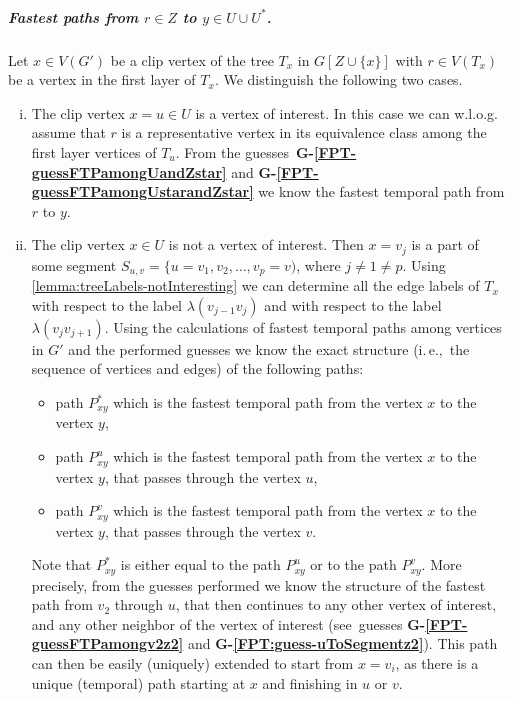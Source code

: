 \documentclass[a4paper,UKenglish,cleveref, autoref, thm-restate]{lipics-v2021}
\newcommand{\ie}{i.\,e.,\ }
\begin{document}
\subparagraph{\boldmath Fastest paths from $r \in Z$ to $y \in U \cup U^*$.}
Let $x \in V(G')$ be a clip vertex of the tree $T_x$ in $G[Z \cup \{x\}]$ with $r \in V(T_x)$ be a vertex in the first layer of $T_x$.
We distinguish the following two cases.
\begin{enumerate}[(i)]
    \item \label{FPT:clipInU-1}
    The clip vertex $x =u \in U$ is a vertex of interest.
    In this case we can w.l.o.g. assume that $r$ is a representative vertex in its equivalence class among the first layer vertices of $T_u$.
    From the guesses~\textcolor{lipicsGray}{\textsf{\textbf{G-\ref{FPT-guessFTPamongUandZstar}}}} and \textcolor{lipicsGray}{\textsf{\textbf{G-\ref{FPT-guessFTPamongUstarandZstar}}}}
    we know the fastest temporal path from $r$ to $y$.
    \item \label{FPT:clipNotInU-1}
    The clip vertex $x \in U$ is not a vertex of interest. Then $x = v_j$ is a part of some segment $S_{u,v} = \{u=v_1, v_2, \dots, v_p = v)$, where $j \neq 1 \neq p$.
    Using \cref{lemma:treeLabels-notInteresting} we can determine all the edge labels of $T_x$ with respect to the label $\lambda(v_{j-1}v_j)$ and with respect to the label $\lambda(v_{j}v_{j+1})$.
    Using the calculations of fastest temporal paths among vertices in $G'$ and the performed guesses we know the exact structure (\ie the sequence of vertices and edges) of the following paths:
    \begin{itemize}
        \item path $P_{xy}^*$ which is the fastest temporal path from the vertex $x$ to the vertex $y$,
        \item path $P_{xy}^u$ which is the fastest temporal path from the vertex $x$ to the vertex $y$, that passes through the vertex $u$,
        \item path $P_{xy}^v$ which is the fastest temporal path from the vertex $x$ to the vertex $y$, that passes through the vertex $v$.
    \end{itemize}
    Note that $P_{xy}^*$ is either equal to the path $P_{xy}^u$ or to the path $P_{xy}^v$.
    More precisely, from the guesses performed we know the structure of the fastest path from $v_2$ through $u$, that then continues to any other vertex of interest, and any other neighbor of the vertex of interest (see~guesses \textcolor{lipicsGray}{\textsf{\textbf{G-\ref{FPT-guessFTPamongv2z2}}}} and
    \textcolor{lipicsGray}{\textsf{\textbf{G-\ref{FPT:guess-uToSegmentz2}}}}).
    This path can then be easily (uniquely) extended to start from $x=v_i$, as there is a unique (temporal) path starting at $x$ and finishing in $u$ or $v$. 
    

\end{enumerate}
\end{document}
